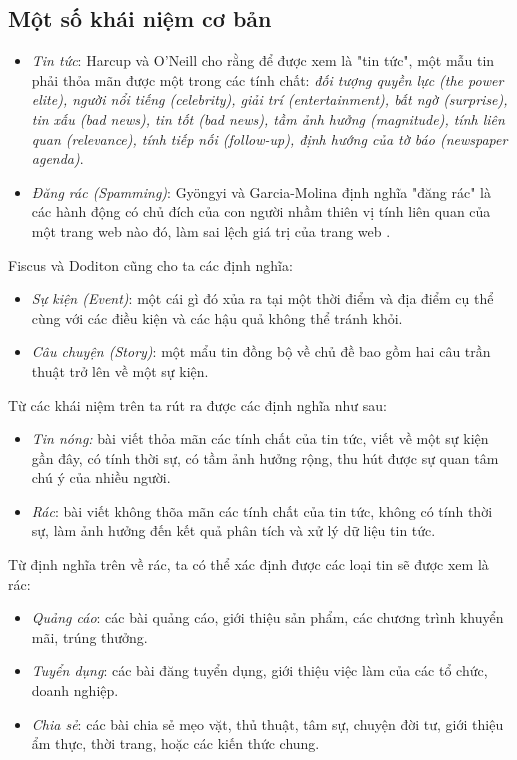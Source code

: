 	\subsection{Một số khái niệm cơ bản}
	\begin{itemize}
    \item \textit{Tin tức}: Harcup và O'Neill cho rằng để được xem là "tin tức", một mẫu tin phải thỏa mãn được một trong các tính chất: \textit{đối tượng quyền lực (the power elite), người nổi tiếng (celebrity), giải trí (entertainment), bất ngờ (surprise), tin xấu (bad news), tin tốt (bad news), tầm ảnh hưởng (magnitude), tính liên quan (relevance), tính tiếp nối (follow-up), định hướng của tờ báo (newspaper agenda)}\cite{doi:10.1080/14616700118449}.
    \item \textit{Đăng rác (Spamming)}: Gy\"{o}ngyi và Garcia-Molina định nghĩa "đăng rác" là các hành động có chủ đích của con người nhầm thiên vị tính liên quan của một trang web nào đó, làm sai lệch giá trị của trang web \cite{Gyongyi:2004:CWS:1316689.1316740}.
	\end{itemize}
  Fiscus và Doditon \cite{Fiscus:TDTDefinition} cũng cho ta các định nghĩa:
  \begin{itemize}
    \item \textit{Sự kiện (Event)}: một cái gì đó xủa ra tại một thời điểm và địa điểm cụ thể cùng với các điều kiện và các hậu quả không thể tránh khỏi.
    \item \textit{Câu chuyện (Story)}: một mẩu tin đồng bộ về chủ đề bao gồm hai câu trần thuật trở lên về một sự kiện.
  \end{itemize}
  Từ các khái niệm trên ta rút ra được các định nghĩa như sau:
  \begin{itemize}
    \item \textit{Tin nóng:} bài viết thỏa mãn các tính chất của tin tức, viết về một sự kiện gần đây, có tính thời sự, có tầm ảnh hưởng rộng, thu hút được sự quan tâm chú ý của nhiều người.
    \item \textit{Rác}: bài viết không thõa mãn các tính chất của tin tức, không có tính thời sự, làm ảnh hưởng đến kết quả phân tích và xử lý dữ liệu tin tức.
  \end{itemize}

  Từ định nghĩa trên về rác, ta có thể xác định được các loại tin sẽ được xem là rác:
  \begin{itemize}
    \item \textit{Quảng cáo}: các bài quảng cáo, giới thiệu sản phẩm, các chương trình khuyển mãi, trúng thưởng.
    \item \textit{Tuyển dụng}: các bài đăng tuyển dụng, giới thiệu việc làm của các tổ chức, doanh nghiệp.
    \item \textit{Chia sẻ}: các bài chia sẻ mẹo vặt, thủ thuật, tâm sự, chuyện đời tư, giới thiệu ẩm thực, thời trang, hoặc các kiến thức chung.
  \end{itemize}

